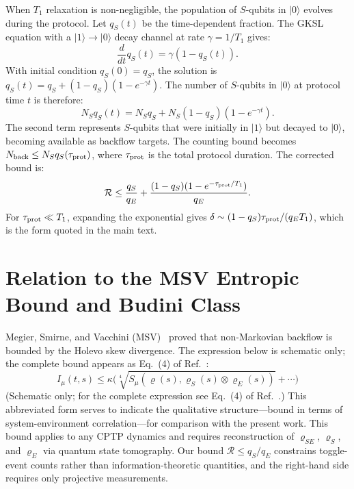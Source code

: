 \documentclass[aps,pra,onecolumn]{revtex4-2}
\begin{document}
When $T_1$ relaxation is non-negligible, the population of $S$-qubits in $|0\rangle$ evolves during the protocol. Let $q_S(t)$ be the time-dependent fraction. The GKSL equation with a $|1\rangle \to |0\rangle$ decay channel at rate $\gamma = 1/T_1$ gives:
\begin{equation}
\frac{d}{dt} q_S(t) = \gamma(1 - q_S(t)).
\end{equation}
With initial condition $q_S(0) = q_S$, the solution is $q_S(t) = q_S + (1-q_S)(1-e^{-\gamma t})$. The number of $S$-qubits in $|0\rangle$ at protocol time $t$ is therefore:
\begin{equation}
N_S q_S(t) = N_S q_S + N_S(1-q_S)(1-e^{-\gamma t}).
\end{equation}
The second term represents $S$-qubits that were initially in $|1\rangle$ but decayed to $|0\rangle$, becoming available as backflow targets. The counting bound becomes $N_{\rm back} \leq N_S q_S(\tau_{\rm prot})$, where $\tau_{\rm prot}$ is the total protocol duration. The corrected bound is:
\begin{equation}
\mathcal{R} \leq \frac{q_S}{q_E} + \frac{(1-q_S)(1-e^{-\tau_{\rm prot}/T_1})}{q_E}.
\end{equation}
For $\tau_{\rm prot} \ll T_1$, expanding the exponential gives $\delta \sim (1-q_S)\tau_{\rm prot}/(q_E T_1)$, which is the form quoted in the main text.

\section{Relation to the MSV Entropic Bound and Budini Class}

Megier, Smirne, and Vacchini (MSV)~\cite{Megier:2021} proved that non-Markovian backflow is bounded by the Holevo skew divergence. The expression below is schematic only; the complete bound appears as Eq.~(4) of Ref.~\cite{Megier:2021}:
\begin{equation}
I_\mu(t,s) \leq \kappa\Big(\sqrt[4]{S_\mu(\varrho(s), \varrho_S(s) \otimes \varrho_E(s))} + \cdots\Big)
\end{equation}
(Schematic only; for the complete expression see Eq.~(4) of Ref.~\cite{Megier:2021}.)
This abbreviated form serves to indicate the qualitative structure---bound in terms of system-environment correlation---for comparison with the present work.
This bound applies to any CPTP dynamics and requires reconstruction of $\varrho_{SE}$, $\varrho_S$, and $\varrho_E$ via quantum state tomography. Our bound $\mathcal{R} \leq q_S/q_E$ constrains toggle-event counts rather than information-theoretic quantities, and the right-hand side requires only projective measurements.
\end{document}
